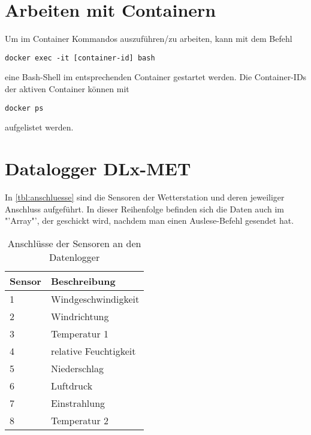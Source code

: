 \section{Arbeiten mit Containern}
Um im Container Kommandos auszuführen/zu arbeiten, kann mit dem Befehl
\begin{verbatim}
docker exec -it [container-id] bash
\end{verbatim}
eine Bash-Shell im entsprechenden Container gestartet werden. Die Container-IDs der aktiven Container können mit 
\begin{verbatim}
docker ps
\end{verbatim}
aufgelistet werden.

\section{Datalogger DLx-MET}

In \autoref{tbl:anschluesse} sind die Sensoren der Wetterstation und deren jeweiliger Anschluss aufgeführt. In dieser Reihenfolge befinden sich die Daten auch im "'Array"', der geschickt wird, nachdem man einen Auslese-Befehl gesendet hat.

\begin{table}[H]
	\centering
	\caption{Anschlüsse der Sensoren an den Datenlogger}
	\label{tbl:anschluesse}
	\begin{tabularx}{0.5\textwidth}{XX}  
		\toprule
		\textbf{Sensor} & \textbf{Beschreibung} \\
		\midrule
		1 	&  Windgeschwindigkeit      	\\
		2 	&  Windrichtung 	    \\
		3   &	Temperatur 1 \\
		4   & relative Feuchtigkeit\\
		5   & Niederschlag  \\
		6   & Luftdruck \\
		7   & Einstrahlung \\
		8   & Temperatur 2\\
		\bottomrule
	\end{tabularx}
\end{table}

